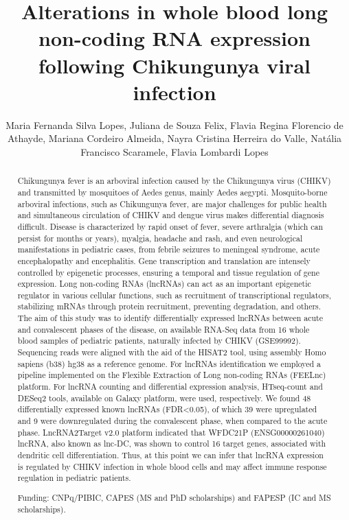 \documentclass[twoside]{article}
\title{\vspace{-15mm}\fontsize{24pt}{10pt}\selectfont\textbf{ Alterations in whole blood long non-coding RNA expression following Chikungunya viral infection }} %
\author{ Maria Fernanda Silva Lopes, Juliana de Souza Felix, Flavia Regina Florencio de Athayde, Mariana Cordeiro Almeida, Nayra Cristina Herreira do Valle, Nat\'alia Francisco Scaramele, Flavia Lombardi Lopes }
\affil{ FMVA-Unesp }
\date{}
\begin{document}
  
  
  \maketitle %
  
  
  \thispagestyle{fancy} %
  
  
  \begin{abstract}
  Chikungunya fever is an arboviral infection caused by the Chikungunya virus (CHIKV) and transmitted by mosquitoes of Aedes genus,  mainly Aedes aegypti. Mosquito-borne arboviral infections,  such as Chikungunya fever,  are major challenges for public health and simultaneous circulation of CHIKV and dengue virus makes differential diagnosis difficult. Disease is characterized by rapid onset of fever,  severe arthralgia (which can persist for months or years),  myalgia,  headache and rash,  and even neurological manifestations in pediatric cases,  from febrile seizures to meningeal syndrome,  acute encephalopathy and encephalitis. Gene transcription and translation are intensely controlled by epigenetic processes,  ensuring a temporal and tissue regulation of gene expression. Long non-coding RNAs (lncRNAs) can act as an important epigenetic regulator in various cellular functions,  such as recruitment of transcriptional regulators,  stabilizing mRNAs through protein recruitment,  preventing degradation,  and others. The aim of this study was to identify differentially expressed lncRNAs between acute and convalescent phases of the disease,  on available RNA-Seq data from 16 whole blood samples of pediatric patients,  naturally infected by CHIKV (GSE99992). Sequencing reads were aligned with the aid of the HISAT2 tool,  using assembly Homo sapiens (b38) hg38 as a reference genome. For lncRNAs identification we employed a pipeline implemented on the Flexible Extraction of Long non-coding RNAs (FEELnc) platform. For lncRNA counting and differential expression analysis,  HTseq-count and DESeq2 tools,  available on Galaxy platform,  were used,  respectively. We found 48 differentially expressed known lncRNAs (FDR<0.05),  of which 39 were upregulated and  9 were downregulated during the convalescent phase,  when compared to the acute phase. LncRNA2Target v2.0 platform indicated that WFDC21P (ENSG00000261040) lncRNA,  also known as lnc-DC,  was shown to control 16 target genes,  associated with dendritic cell differentiation. Thus,  at this point we can infer that lncRNA expression is regulated by CHIKV infection in whole blood cells and may affect immune response regulation in pediatric patients.
  
  Funding: CNPq/PIBIC,  CAPES (MS and PhD scholarships) and FAPESP (IC and MS scholarships). \\ 
  \end{abstract}
  
\end{document}
